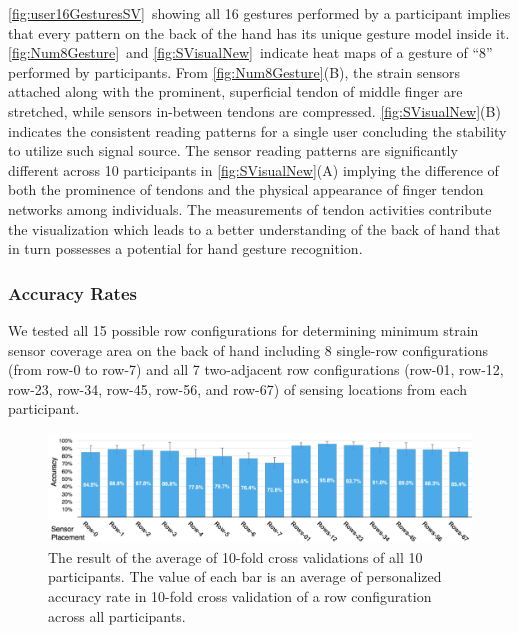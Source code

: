 \documentclass{sigchi}
\begin{document}
\autoref{fig:user16GesturesSV}\ showing all 16 gestures performed by a participant implies that every pattern on the back of the hand has its unique gesture model inside it.
\autoref{fig:Num8Gesture}\ and \autoref{fig:SVisualNew}\ indicate heat maps of a gesture of ``8'' performed by participants.
From \autoref{fig:Num8Gesture}(B), the strain sensors attached along with the prominent, superficial tendon of middle finger are stretched, while sensors in-between tendons are compressed.
\autoref{fig:SVisualNew}(B) indicates the consistent reading patterns for a single user concluding the stability to utilize such signal source.
The sensor reading patterns are significantly different across 10 participants in \autoref{fig:SVisualNew}(A) implying the difference of both the prominence of tendons and the physical appearance of finger tendon networks among individuals.
The measurements of tendon activities contribute the visualization which leads to a better understanding of the back of hand that in turn possesses a potential for hand gesture recognition.

\subsubsection{Accuracy Rates}
We tested all 15 possible row configurations for determining minimum strain sensor coverage area on the back of hand including 8 single-row configurations (from row-0 to row-7) and all 7 two-adjacent row configurations (row-01, row-12, row-23, row-34, row-45, row-56, and row-67) of sensing locations from each participant.

\begin{figure}[t]
 \begin{center}
  \includegraphics[width=2\columnwidth]{figures/10FCV_16_v3.pdf}
  \caption{
    The result of the average of 10-fold cross validations of all 10 participants. The value of each bar is an average of personalized accuracy rate in 10-fold cross validation of a row configuration across all participants.
  }
  \label{fig:accuracy16Gs}
  \end{center}
\end{figure}
\end{document}
